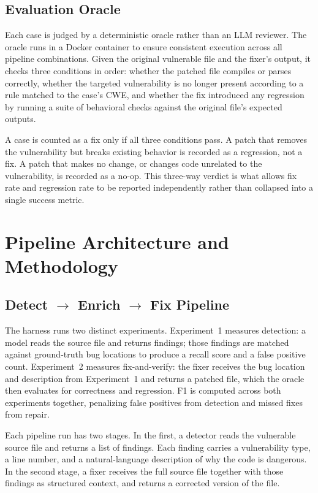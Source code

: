 \documentclass[12pt]{article}
\begin{document}
\subsection{Evaluation Oracle}

Each case is judged by a deterministic oracle rather than an LLM reviewer.
The oracle runs in a Docker container to ensure consistent execution across
all pipeline combinations. Given the original vulnerable file and the fixer's
output, it checks three conditions in order: whether the patched file compiles
or parses correctly, whether the targeted vulnerability is no longer present
according to a rule matched to the case's CWE, and whether the fix introduced
any regression by running a suite of behavioral checks against the original
file's expected outputs.

A case is counted as a fix only if all three conditions pass. A patch that
removes the vulnerability but breaks existing behavior is recorded as a
regression, not a fix. A patch that makes no change, or changes code
unrelated to the vulnerability, is recorded as a no-op. This three-way
verdict is what allows fix rate and regression rate to be reported
independently rather than collapsed into a single success metric.

\section{Pipeline Architecture and Methodology}
\label{sec:methodology}

\subsection{Detect $\rightarrow$ Enrich $\rightarrow$ Fix Pipeline}

The harness runs two distinct experiments. Experiment~1 measures detection:
a model reads the source file and returns findings; those findings are matched
against ground-truth bug locations to produce a recall score and a false
positive count. Experiment~2 measures fix-and-verify: the fixer receives the
bug location and description from Experiment~1 and returns a patched file,
which the oracle then evaluates for correctness and regression. F1 is computed
across both experiments together, penalizing false positives from detection
and missed fixes from repair.

Each pipeline run has two stages. In the first, a detector reads the
vulnerable source file and returns a list of findings. Each finding carries a
vulnerability type, a line number, and a natural-language description of why
the code is dangerous. In the second stage, a fixer receives the full source
file together with those findings as structured context, and returns a
corrected version of the file.
\end{document}
